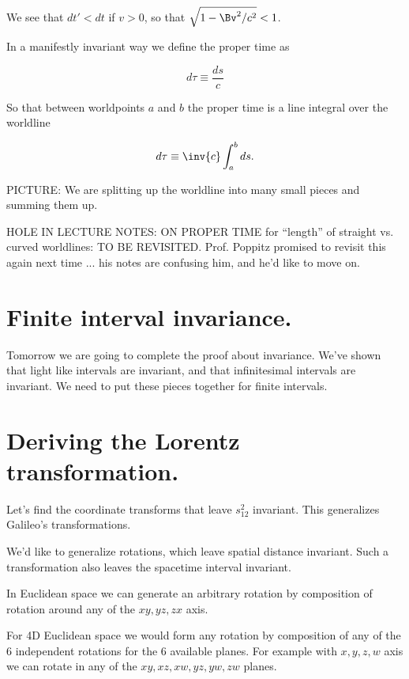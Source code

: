 We see that $dt' < dt$ if $v > 0$, so that $\sqrt{1-\Bv^2/c^2} < 1$.

In a manifestly invariant way we define the proper time as 

\begin{equation}\label{eqn:relativisticElectrodynamicsL4:20}
d\tau \equiv \frac{ds}{c}
\end{equation}

So that between worldpoints $a$ and $b$ the proper time is a line integral over the worldline

\begin{equation}\label{eqn:relativisticElectrodynamicsL4:30}
d\tau \equiv \inv{c} \int_a^b ds.
\end{equation}

PICTURE: We are splitting up the worldline into many small pieces and summing them up.

HOLE IN LECTURE NOTES: ON PROPER TIME for ``length'' of straight vs. curved worldlines: TO BE REVISITED.  Prof. Poppitz promised to revisit this again next time ... his notes are confusing him, and he'd like to move on.

\section{Finite interval invariance.}

Tomorrow we are going to complete the proof about invariance.  We've shown that light like intervals are invariant, and that infinitesimal intervals are invariant.  We need to put these pieces together for finite intervals.

\section{Deriving the Lorentz transformation.}

Let's find the coordinate transforms that leave $s_{12}^2$ invariant.  This generalizes Galileo's transformations.

We'd like to generalize rotations, which leave spatial distance invariant.  Such a transformation also leaves the spacetime interval invariant.

In Euclidean space we can generate an arbitrary rotation by composition of rotation around any of the $xy, yz, zx$ axis.

For 4D Euclidean space we would form any rotation by composition of any of the 6 independent rotations for the 6 available planes.  For example with $x,y,z,w$ axis we can rotate in any of the $xy, xz, xw, yz, yw, zw$ planes.

